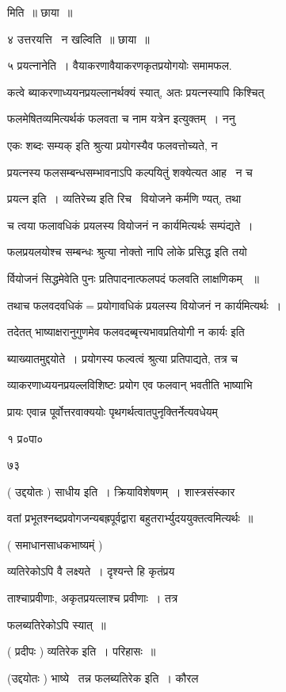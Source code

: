 \documentclass[11pt, openany]{book}
\begin{document}
मिति~॥ छाया~॥

४ उत्तरयत्ति \textendash\ न खल्विति~॥ छाया~॥ 

५ प्रयत्नानेति~। वैयाकरणावैयाकरणकृतप्रयोगयोः समामफल. 

कत्वे ब्याकरणाध्ययनप्रयल्लानर्थक्यं स्यात्, अतः प्रयत्नस्यापि किश्चित्


फलमेषितव्यमित्यर्थकं फलवता च नाम यत्रेन इत्युक्तम्~। ननु 

{\qt एकः शब्दः सम्यक्} इति श्रुत्या प्रयोगस्यैव फलवत्तोच्यते, न 

प्रयत्नस्य फलसम्बन्धसम्भावनाऽपि कल्पयितुं शक्येत्यत आह \textendash\ न च 

प्रयत्न इति~। व्यतिरेच्य इति {\qt रिच \textendash\ वियोजने} कर्मणि ण्यत्, तथा 

च त्वया फलावधिकं प्रयलस्य वियोजनं न कार्यमित्यर्थः सम्पंद्यते~। 

फलप्रयलयोश्च सम्बन्धः श्रुत्या नोक्तो नापि लोके प्रसिद्ध इति तयो \textendash\ 

र्वियोजनं सिद्धमेवेति पुनः प्रतिपादनात्फलपदं फलवति लाक्षणिकम् ~॥ 

तथाच फलवदवधिकं$=$प्रयोगावधिकं प्रयलस्य वियोजनं न कार्यमित्यर्थः~। 

तदेतत् भाष्याक्षरानुगुणमेव {\qt फलवदब्बृत्त्यभावप्रतियोगी न कार्यः} इति 

ब्याख्यातमुद्दयोते~। प्रयोगस्य फल्वत्वं श्रुत्या प्रतिपाद्यते, तत्र च 

व्याकरणाध्ययनप्रयल्लविशिष्टः प्रयोग एव फलवान् भवतीति भाष्याभि \textendash\ 

प्रायः एवान्न पूर्वोत्तरवाक्ययोः पृथगर्थत्वातपुनृक्तिर्नेत्यवधेयम् 

१ प्र०पा० 





७३ 

( उद्दयोतः ) साधीय इति~। क्रियाविशेषणम्~। शास्त्रसंस्कार \textendash\ 

वतां प्रभूतश्नब्दप्रवोगजन्यबह्रपूर्वद्वारा
बहुतरार्भ्युदययुक्तत्वमित्यर्थः~॥ 

( समाधानसाधकभाष्यम्ं ) 

व्यतिरेकोऽपि वै लक्ष्यते~। दृश्यन्ते हि कृतंप्रय \textendash\ 

ताश्चाप्रवीणाः, अकृतप्रयत्लाश्च प्रवीणाः~। तत्र 

फलब्यतिरेकोऽपि स्यात्~॥ 

( प्रदीपः ) व्यतिरेक इति~। परिहासः~॥ 

(उद्दयोतः ) भाष्ये \textendash\ तन्न फलब्यतिरेक इति~। कौरल \textendash\ 
\end{document}
